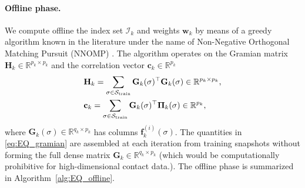 \paragraph{Offline phase.}
We compute offline the index set $\mathcal{I}_k$ and weights $\mathbf{w}_k$ by means of a greedy algorithm known in the literature under the name of Non-Negative Orthogonal Matching Pursuit (NNOMP) \cite{zhang2011sparse}. The algorithm operates on the Gramian matrix $\mathbf{H}_k \in \mathbb{R}^{p_k \times p_k}$ and the correlation vector $\mathbf{c}_k \in \mathbb{R}^{p_k}$
\begin{equation}
\begin{aligned}
    &\mathbf{H}_k = \sum_{\sigma \in \mathcal{S}_{\rm train}} \mathbf{G}_k(\sigma)^\top \mathbf{G}_k(\sigma) \in \mathbb{R}^{p_k \times p_k}, \\
   & \mathbf{c}_k = \sum_{\sigma \in \mathcal{S}_{\rm train}} \mathbf{G}_k(\sigma)^\top \boldsymbol{\Pi}_k(\sigma) \in \mathbb{R}^{p_k},
    \end{aligned}
    \label{eq:EQ_gramian}
\end{equation}
where $\mathbf{G}_k(\sigma) \in \mathbb{R}^{q_k \times p_k}$ has columns $\mathbf{f}_k^{(i)}(\sigma)$. The quantities in  \eqref{eq:EQ_gramian} are assembled at each iteration from training snapshots without forming the full dense matrix $\mathbf{G}_k \in \mathbb{R}^{q_k \times p_k}$ (which would be computationally prohibitive for high-dimensional contact data.). %
The offline phase is summarized in Algorithm~\ref{alg:EQ_offline}.

